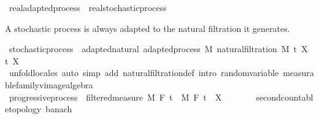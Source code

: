 \begin{isabellebody}
\ real{\isacharunderscore}{\kern0pt}adapted{\isacharunderscore}{\kern0pt}process\ {\isasymsubseteq}\ real{\isacharunderscore}{\kern0pt}stochastic{\isacharunderscore}{\kern0pt}process%
\isadelimproof
\ %
\endisadelimproof
%
\isatagproof
\isacommand{{\isachardot}{\kern0pt}{\isachardot}{\kern0pt}}\isamarkupfalse%
%
\endisatagproof
{\isafoldproof}%
%
\isadelimproof
%
\endisadelimproof
%
\begin{isamarkuptext}%
A stochastic process is always adapted to the natural filtration it generates.%
\end{isamarkuptext}\isamarkuptrue%
\isamarkupfalse%
\ stochastic{\isacharunderscore}{\kern0pt}process\ {\isasymsubseteq}\ adapted{\isacharunderscore}{\kern0pt}natural{\isacharcolon}{\kern0pt}\ adapted{\isacharunderscore}{\kern0pt}process\ M\ {\isachardoublequoteopen}natural{\isacharunderscore}{\kern0pt}filtration\ M\ t\ X{\isachardoublequoteclose}\ t\ X%
\isadelimproof
\ %
\endisadelimproof
%
\isatagproof
{}\isamarkupfalse%
\ {\isacharparenleft}{\kern0pt}unfold{\isacharunderscore}{\kern0pt}locales{\isacharparenright}{\kern0pt}\ {\isacharparenleft}{\kern0pt}auto\ simp\ add{\isacharcolon}{\kern0pt}\ natural{\isacharunderscore}{\kern0pt}filtration{\isacharunderscore}{\kern0pt}def\ intro{\isacharcolon}{\kern0pt}\ random{\isacharunderscore}{\kern0pt}variable\ measurable{\isacharunderscore}{\kern0pt}family{\isacharunderscore}{\kern0pt}vimage{\isacharunderscore}{\kern0pt}algebra{\isacharparenright}{\kern0pt}%
\endisatagproof
{\isafoldproof}%
%
\isadelimproof
%
\endisadelimproof
%
\isadelimdocument
%
\endisadelimdocument
%
\isatagdocument
%
\isamarkuptrue%
%
\endisatagdocument
{\isafolddocument}%
%
\isadelimdocument
%
\endisadelimdocument
{}\isamarkupfalse%
\ progressive{\isacharunderscore}{\kern0pt}process\ {\isacharequal}{\kern0pt}\ filtered{\isacharunderscore}{\kern0pt}measure\ M\ F\ t\ \ M\ F\ t\ \ X\ {\isacharcolon}{\kern0pt}{\isacharcolon}{\kern0pt}\ {\isachardoublequoteopen}{\isacharunderscore}{\kern0pt}\ {\isasymRightarrow}\ {\isacharunderscore}{\kern0pt}\ {\isasymRightarrow}\ {\isacharunderscore}{\kern0pt}\ {\isacharcolon}{\kern0pt}{\isacharcolon}{\kern0pt}\ {\isacharbraceleft}{\kern0pt}second{\isacharunderscore}{\kern0pt}countable{\isacharunderscore}{\kern0pt}topology{\isacharcomma}{\kern0pt}\ banach{\isacharbraceright}{\kern0pt}{\isachardoublequoteclose}\ {\isacharplus}{\kern0pt}\isanewline

\end{isabellebody}
